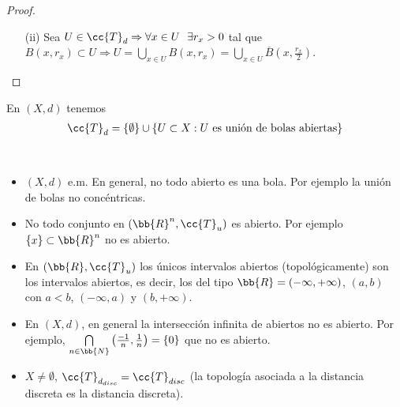 \begin{prop}
\begin{proof}
\begin{enumerate}
\begin{center}
            \end{center}
            
            \item[(ii)] Sea $U \in \cc{T}_d \Rightarrow \forall x \in U \ \ \exists r_x >0$ tal que $B(x,r_x)\subset U \Rightarrow U = \bigcup\limits_{x\in U}B(x, r_x) = \bigcup\limits_{x\in U}\overline{B}\left(x, \frac{r_x}{2}\right)$.
            
        \end{enumerate}
    \end{proof}
\end{prop}

\begin{coro}
    En $(X,d)$ tenemos 
    \begin{gather*}
        \cc{T}_d=\{\emptyset\}\cup\{U \subset X : U \text{ es unión de bolas abiertas}\}
    \end{gather*}
    \endsquare
\end{coro}

\begin{ejemplo}\
    \begin{itemize}
        \item $(X,d)$ e.m. En general, no todo abierto es una bola. Por ejemplo la unión de bolas no concéntricas.
        \item No todo conjunto en $(\bb{R}^n, \cc{T}_u)$ es abierto. Por ejemplo $\{x\}\subset \bb{R}^n$ no es abierto.
        \item En $(\bb{R}, \cc{T}_u)$ los únicos intervalos abiertos (topológicamente) son los intervalos abiertos, es decir, los del tipo $\bb{R}=(-\infty, +\infty)$, $(a,b)$ con $a<b$, $(-\infty, a)$ y $(b, +\infty)$.
        \item En $(X, d)$, en general la intersección infinita de abiertos no es abierto. Por ejemplo, $\bigcap\limits_{n\in \bb{N}}\left(\frac{-1}{n}, \frac{1}{n}\right) = \{0\}$ que no es abierto.
        \item $X\neq \emptyset$, $\cc{T}_{d_{disc}}=\cc{T}_{disc}$ (la topología asociada a la distancia discreta es la distancia discreta).
    \end{itemize}
    \endsquare
\end{ejemplo}

